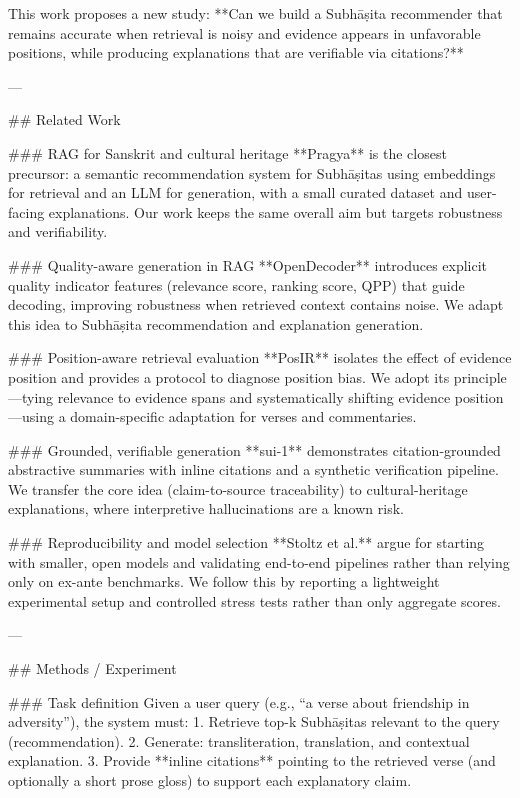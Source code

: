 This work proposes a new study: **Can we build a Subhāṣita recommender that remains accurate when retrieval is noisy and evidence appears in unfavorable positions, while producing explanations that are verifiable via citations?**

---

## Related Work  

### RAG for Sanskrit and cultural heritage  
**Pragya** is the closest precursor: a semantic recommendation system for Subhāṣitas using embeddings for retrieval and an LLM for generation, with a small curated dataset and user-facing explanations. Our work keeps the same overall aim but targets robustness and verifiability.

### Quality-aware generation in RAG  
**OpenDecoder** introduces explicit quality indicator features (relevance score, ranking score, QPP) that guide decoding, improving robustness when retrieved context contains noise. We adapt this idea to Subhāṣita recommendation and explanation generation.

### Position-aware retrieval evaluation  
**PosIR** isolates the effect of evidence position and provides a protocol to diagnose position bias. We adopt its principle—tying relevance to evidence spans and systematically shifting evidence position—using a domain-specific adaptation for verses and commentaries.

### Grounded, verifiable generation  
**sui-1** demonstrates citation-grounded abstractive summaries with inline citations and a synthetic verification pipeline. We transfer the core idea (claim-to-source traceability) to cultural-heritage explanations, where interpretive hallucinations are a known risk.

### Reproducibility and model selection  
**Stoltz et al.** argue for starting with smaller, open models and validating end-to-end pipelines rather than relying only on ex-ante benchmarks. We follow this by reporting a lightweight experimental setup and controlled stress tests rather than only aggregate scores.

---

## Methods / Experiment  

### Task definition  
Given a user query (e.g., “a verse about friendship in adversity”), the system must:
1. Retrieve top-k Subhāṣitas relevant to the query (recommendation).
2. Generate: transliteration, translation, and contextual explanation.
3. Provide **inline citations** pointing to the retrieved verse (and optionally a short prose gloss) to support each explanatory claim.

